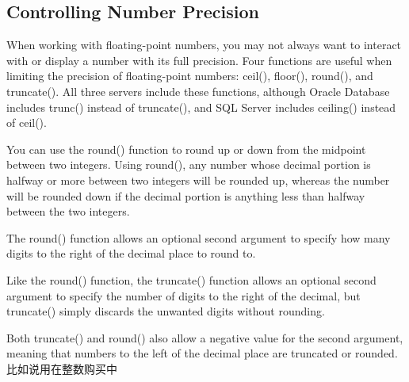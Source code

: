 \subsection{Controlling Number Precision}
When working with floating-point numbers, you may not always want to interact with or display a number with its full precision. Four functions are useful when limiting the precision of floating-point numbers: ceil(), floor(), round(), and truncate(). All three servers include these functions, although Oracle Database includes trunc() instead of truncate(), and SQL Server includes ceiling() instead of ceil().

You can use the round() function to round up or down from the midpoint between two integers. Using round(), any number whose decimal portion is halfway or more between two integers will be rounded up, whereas the number will be rounded down if the decimal portion is anything less than halfway between the two integers.

The round() function allows an optional second argument to specify how many digits to the right of the decimal place to round to.

Like the round() function, the truncate() function allows an optional second argument to specify the number of digits to the right of the decimal, but truncate() simply discards the unwanted digits without rounding.

Both truncate() and round() also allow a negative value for the second argument, meaning that numbers to the left of the decimal place are truncated or rounded.比如说用在整数购买中
